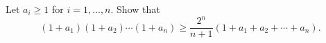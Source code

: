 Let $a_i \geq 1$ for $i = 1, \ldots, n$. Show that
\[ (1 + a_1)(1 + a_2) \cdots (1 + a_n) \geq \frac{2^n}{n + 1}(1 + a_1 + a_2 + \cdots + a_n). \]
